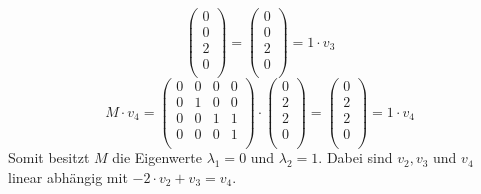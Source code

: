 \documentclass{scrreprt}
\begin{document}
\begin{enumerate}[(a)]
\begin{itemize}
\[\begin{pmatrix}
        0 \\
        0 \\
        2 \\
        0 \\
      \end{pmatrix} = \begin{pmatrix}
        0 \\
        0 \\
        2 \\
        0 \\
      \end{pmatrix} = 1 \cdot v_3
    \]
    \[
      M \cdot v_4 = \begin{pmatrix}
        0 & 0 & 0 & 0 \\
        0 & 1 & 0 & 0 \\
        0 & 0 & 1 & 1 \\
        0 & 0 & 0 & 1 \\
      \end{pmatrix} \cdot \begin{pmatrix}
        0  \\
        2  \\
        2  \\
        0  \\
      \end{pmatrix} = \begin{pmatrix}
        0  \\
        2  \\
        2  \\
        0  \\
      \end{pmatrix} = 1 \cdot v_4
    \]
    Somit besitzt $M$ die Eigenwerte $\lambda_1 = 0$ und $\lambda_2 = 1$.
    Dabei sind $v_2, v_3$ und $v_4$ linear abhängig mit
    $-2 \cdot v_2 + v_3 = v_4$.


\end{itemize}
\end{enumerate}
\end{document}
